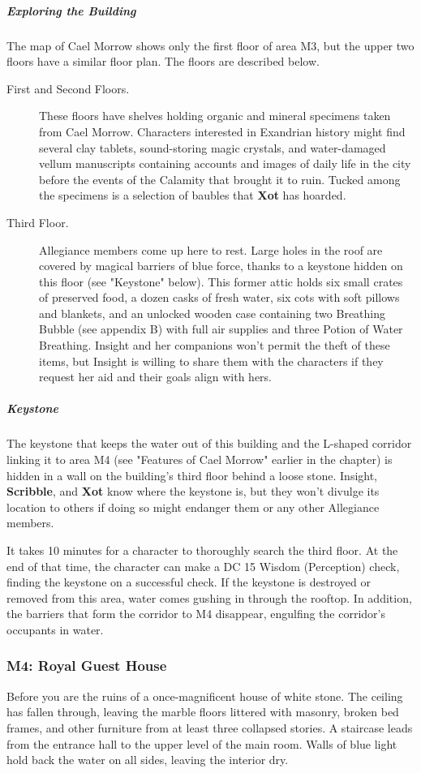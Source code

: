 \documentclass[10pt,a4paper,twoside,bg=print,twocolumn,openany,nodeprecatedcode]{dndbook}
\begin{document}
\subparagraph{Exploring the Building}
The map of Cael Morrow shows only the first floor of area M3, but the upper two floors have a similar floor plan. The floors are described below.


\begin{description}
\item[First and Second Floors.]
These floors have shelves holding organic and mineral specimens taken from Cael Morrow. Characters interested in Exandrian history might find several clay tablets, sound-storing magic crystals, and water-damaged vellum manuscripts containing accounts and images of daily life in the city before the events of the Calamity that brought it to ruin. Tucked among the specimens is a selection of baubles that \textbf{Xot} has hoarded.
\item[Third Floor.]
Allegiance members come up here to rest. Large holes in the roof are covered by magical barriers of blue force, thanks to a keystone hidden on this floor (see "Keystone" below). This former attic holds six small crates of preserved food, a dozen casks of fresh water, six cots with soft pillows and blankets, and an unlocked wooden case containing two Breathing Bubble (see appendix B) with full air supplies and three Potion of Water Breathing. Insight and her companions won't permit the theft of these items, but Insight is willing to share them with the characters if they request her aid and their goals align with hers.
\end{description}

\subparagraph{Keystone}
The keystone that keeps the water out of this building and the L-shaped corridor linking it to area M4 (see "Features of Cael Morrow" earlier in the chapter) is hidden in a wall on the building's third floor behind a loose stone. Insight, \textbf{Scribble}, and \textbf{Xot} know where the keystone is, but they won't divulge its location to others if doing so might endanger them or any other Allegiance members.

It takes 10 minutes for a character to thoroughly search the third floor. At the end of that time, the character can make a DC 15 Wisdom (Perception) check, finding the keystone on a successful check. If the keystone is destroyed or removed from this area, water comes gushing in through the rooftop. In addition, the barriers that form the corridor to M4 disappear, engulfing the corridor's occupants in water.

\subsubsection{M4: Royal Guest House}
\begin{DndReadAloud}{}
Before you are the ruins of a once-magnificent house of white stone. The ceiling has fallen through, leaving the marble floors littered with masonry, broken bed frames, and other furniture from at least three collapsed stories. A staircase leads from the entrance hall to the upper level of the main room. Walls of blue light hold back the water on all sides, leaving the interior dry.

\end{DndReadAloud}
\end{document}
